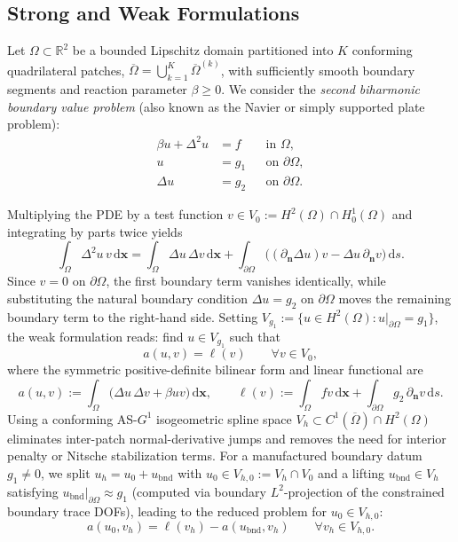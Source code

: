\documentclass[11pt,a4paper]{article}
\newcommand{\R}{\mathbb{R}}
\newcommand{\dd}{\,\mathrm{d}}
\newcommand{\bn}{\mathbf{n}}
\newcommand{\bx}{\mathbf{x}}
\begin{document}
\subsection{Strong and Weak Formulations}
Let $\Omega \subset \R^2$ be a bounded Lipschitz domain partitioned into $K$ conforming quadrilateral patches, $\overline{\Omega} = \bigcup_{k=1}^K \overline{\Omega}^{(k)}$, with sufficiently smooth boundary segments and reaction parameter $\beta \ge 0$. We consider the \emph{second biharmonic boundary value problem} (also known as the Navier or simply supported plate problem):
\begin{equation}
\label{eq:strong}
\begin{aligned}
    \beta u + \Delta^2 u &= f && \text{in } \Omega,\\
    u &= g_1 && \text{on } \partial\Omega,\\
    \Delta u &= g_2 && \text{on } \partial\Omega.
\end{aligned}
\end{equation}

Multiplying the PDE by a test function $v \in V_0 := H^2(\Omega) \cap H_0^1(\Omega)$ and integrating by parts twice yields
\begin{equation}
\int_\Omega \Delta^2 u \, v \dd\bx
= \int_\Omega \Delta u \, \Delta v \dd\bx
  + \int_{\partial\Omega} \bigl( (\partial_{\bn} \Delta u) v - \Delta u \, \partial_{\bn} v \bigr) \dd s.
\end{equation}
Since $v = 0$ on $\partial\Omega$, the first boundary term vanishes identically, while substituting the natural boundary condition $\Delta u = g_2$ on $\partial\Omega$ moves the remaining boundary term to the right-hand side. Setting $V_{g_1} := \{ u \in H^2(\Omega) : u|_{\partial\Omega} = g_1 \}$, the weak formulation reads: find $u \in V_{g_1}$ such that
\begin{equation}
\label{eq:weak}
a(u, v) = \ell(v) \qquad \forall v \in V_0,
\end{equation}
where the symmetric positive-definite bilinear form and linear functional are
\begin{equation}
\label{eq:bilin_rhs}
a(u,v) := \int_\Omega \bigl( \Delta u \, \Delta v + \beta u v \bigr) \dd\bx, \qquad
\ell(v) := \int_\Omega f v \dd\bx + \int_{\partial\Omega} g_2 \, \partial_{\bn} v \dd s.
\end{equation}
Using a conforming AS-$G^1$ isogeometric spline space $V_h \subset C^1(\overline{\Omega}) \cap H^2(\Omega)$ eliminates inter-patch normal-derivative jumps and removes the need for interior penalty or Nitsche stabilization terms. For a manufactured boundary datum $g_1 \neq 0$, we split $u_h = u_0 + u_{\mathrm{bnd}}$ with $u_0 \in V_{h,0} := V_h \cap V_0$ and a lifting $u_{\mathrm{bnd}} \in V_h$ satisfying $u_{\mathrm{bnd}}|_{\partial\Omega} \approx g_1$ (computed via boundary $L^2$-projection of the constrained boundary trace DOFs), leading to the reduced problem for $u_0 \in V_{h,0}$:
\begin{equation}
\label{eq:lifted_weak}
a(u_0, v_h) = \ell(v_h) - a(u_{\mathrm{bnd}}, v_h) \qquad \forall v_h \in V_{h,0}.
\end{equation}
\end{document}
